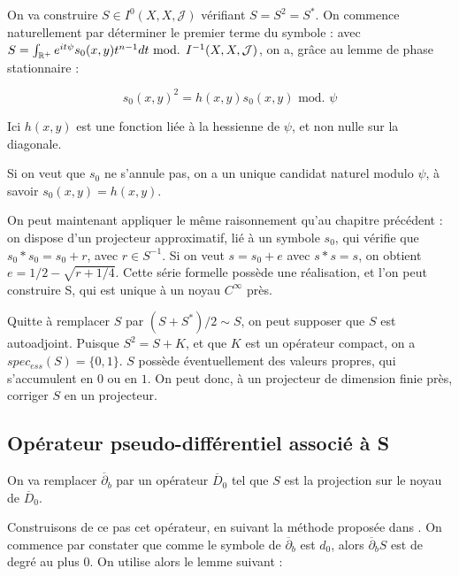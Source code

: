 On va construire $S \in I^0(X,X,\mathcal{J})$ vérifiant $S =S^2 = S^*$. On commence naturellement par déterminer le premier terme du symbole : avec $S = \int_{\mathbb{R}^+}e^{it\psi}s_0(x,y)t^{n-1}dt \text{ mod. } I^{-1}(X,X,\mathcal{J})$, on a, grâce au lemme de phase stationnaire :

\begin{equation*}
	s_0(x,y)^2= h(x,y)s_0(x,y) \text{ mod. } \psi
\end{equation*}

Ici $h(x,y)$ est une fonction liée à la hessienne de $\psi$, et non nulle sur la diagonale.

Si on veut que $s_0$ ne s'annule pas, on a un unique candidat naturel modulo $\psi$, à savoir $s_0(x,y)= h(x,y)$.

On peut maintenant appliquer le même raisonnement qu'au chapitre précédent : on dispose d'un projecteur approximatif, lié à un symbole $s_0$, qui vérifie que $s_0 * s_0 = s_0 +r$, avec $r \in S^{-1}$. Si on veut $s=s_0 + e$ avec $s * s = s$, on obtient $e = 1/2 - \sqrt{r + 1/4}$. Cette série formelle possède une réalisation, et l'on peut construire S, qui est unique à un noyau $C^{\infty}$ près.

Quitte à remplacer $S$ par $(S+S^*)/2 \sim S$, on peut supposer que $S$ est autoadjoint. Puisque $S^2=S+K$, et que $K$ est un opérateur compact, on a $spec_{ess}(S)=\{0,1\}$. $S$ possède éventuellement des valeurs propres, qui s'accumulent en $0$ ou en $1$. On peut donc, à un projecteur de dimension finie près, corriger $S$ en un projecteur.

\subsection{Opérateur  pseudo-différentiel associé à S}
On va remplacer $\overline{\partial}_b$ par un opérateur $\overline{D}_0$ tel que $S$ est la projection sur le noyau de $\overline{D}_0$. 

Construisons de ce pas cet opérateur, en suivant la méthode proposée dans \cite{BoutetdeMonvel1981}. On commence par constater que comme le symbole de $\overline{\partial}_b$ est $d_0$, alors $\overline{\partial}_b S$ est de degré au plus $0$. On utilise alors le lemme suivant :


